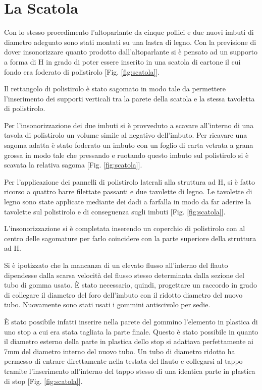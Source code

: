 \section{La Scatola}

Con lo stesso procedimento l’altoparlante da cinque pollici e due nuovi  imbuti di diametro adeguato sono stati montati su una lastra di legno.
Con la previsione di dover insonorizzare quanto prodotto dall’altoparlante  si è pensato ad un supporto a forma di H in grado di poter essere inserito in una scatola di cartone il cui fondo era foderato di polistirolo [Fig. \ref{fig:scatola}].

Il rettangolo di polistirolo è stato sagomato in modo tale da permettere l’inserimento dei supporti verticali tra la parete della scatola e la stessa tavoletta di polistirolo.

Per l’insonorizzazione dei due imbuti si è provveduto a scavare  all’interno di una tavola di polistirolo  un volume simile al negativo dell’imbuto.
Per ricavare una sagoma adatta è stato foderato un imbuto con un foglio di carta vetrata  a grana grossa  in modo tale che pressando e ruotando  questo imbuto sul polistirolo si è scavata la relativa sagoma [Fig. \ref{fig:scatola}].


Per l’applicazione dei pannelli di polistirolo laterali alla struttura ad H, si è fatto ricorso a quattro barre filettate passanti  e due  tavolette di legno.  Le tavolette di legno sono state applicate mediante dei dadi a farfalla  in modo da far aderire la tavolette sul polistirolo e di conseguenza sugli imbuti [Fig. \ref{fig:scatola}].

L’insonorizzazione si è completata inserendo un coperchio di polistirolo con al centro delle sagomature per farlo coincidere con la parte superiore della struttura ad H.

Si è ipotizzato che la mancanza di un elevato flusso all’interno del flauto dipendesse dalla scarsa velocità del flusso stesso determinata dalla  sezione del tubo di gomma usato. È stato necessario, quindi, progettare un raccordo in grado di collegare il diametro del foro dell’imbuto con il ridotto diametro del nuovo tubo. Nuovamente sono stati usati i gommini antiscivolo per sedie.

È stato possibile infatti inserire nella parete del gommino l’elemento in plastica di uno stop a cui era stata tagliata la  parte finale. Questo è stato possibile in quanto il diametro esterno  della parte in plastica dello stop si adattava perfettamente ai 7mm del diametro interno del nuovo tubo. Un tubo di diametro ridotto ha permesso di entrare direttamente nella testata del flauto e collegarsi al tappo tramite l’inserimento all’interno del tappo stesso  di una identica parte in plastica di stop [Fig. \ref{fig:scatola}].

